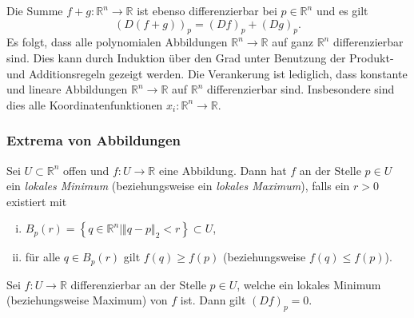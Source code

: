 \documentclass[../main.tex]{subfiles}
\begin{document}
\begin{remark}
  Die Summe $f + g \colon \mathbb{R}^n \to \mathbb{R}$ 
  ist ebenso differenzierbar bei $p \in \mathbb{R}^n$ 
  und es gilt
  \[
    {(D(f+g))}_p = {(Df)}_p + {(Dg)}_p.
  \]
  Es folgt, dass alle polynomialen Abbildungen
  $\mathbb{R}^n \to \mathbb{R}$ auf ganz
  $\mathbb{R}^n$ differenzierbar sind.
  Dies kann durch Induktion über den Grad unter
  Benutzung der Produkt- und Additionsregeln
  gezeigt werden.
  Die Verankerung ist lediglich, dass
  konstante und lineare Abbildungen 
  $\mathbb{R}^n \to \mathbb{R}$ auf $\mathbb{R}^n$ 
  differenzierbar sind.
  Insbesondere sind dies alle Koordinatenfunktionen
  $x_i \colon \mathbb{R}^n \to \mathbb{R}$.
\end{remark}

\subsubsection*{Extrema von Abbildungen}
\begin{definition}
Sei $U \subset \mathbb{R}^n$ offen und
$f \colon U \to \mathbb{R}$ eine Abbildung.
Dann hat $f$ an der Stelle $p \in U$ 
ein \emph{lokales Minimum} (beziehungsweise
ein \emph{lokales Maximum}),
falls ein $r > 0$ existiert mit
\begin{enumerate}[(i)]
  \item $B_p(r) = \left\{q \in \mathbb{R}^n \mid 
    \Vert q - p \Vert_2 < r\right\} \subset U$,
  \item für alle $q \in B_p(r)$ gilt
    $f(q) \geq f(p)$ (beziehungsweise $f(q) \leq f(p)$).
\end{enumerate}
\end{definition}

\begin{proposition*}
  Sei $f \colon U \to \mathbb{R}$ differenzierbar
  an der Stelle $p \in U$, welche ein lokales
  Minimum (beziehungsweise Maximum) von $f$ ist.
  Dann gilt ${(Df)}_p = 0$.
\end{proposition*}

\end{document}
